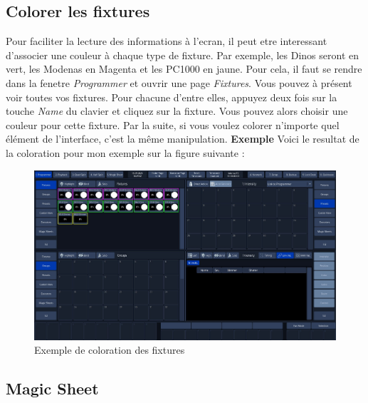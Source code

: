 \subsection{Colorer les fixtures}
\label{subsec:prep_colorer}

Pour faciliter la lecture des informations à l'ecran, il peut etre interessant d'associer une couleur à chaque type de fixture.
Par exemple, les Dinos seront en vert, les Modenas en Magenta et les PC1000 en jaune.
\newline
Pour cela, il faut se rendre dans la fenetre \textit{Programmer} et ouvrir une page \textit{Fixtures}.
\newline
Vous pouvez à présent voir toutes vos fixtures. Pour chacune d'entre elles, appuyez deux fois sur la touche \textit{Name} du clavier
et cliquez sur la fixture. Vous pouvez alors choisir une couleur pour cette fixture.
\newline
Par la suite, si vous voulez colorer n'importe quel élément de l'interface, c'est la même manipulation.
\newline
\newline
\textbf{Exemple}
\newline
\newline
Voici le resultat de la coloration pour mon exemple sur la figure suivante :
\begin{figure}[H]
    \centering
    \includegraphics[width=\textwidth]{3 - Encoder la Chimp/Images/fixture_color.jpg}
    \caption{Exemple de coloration des fixtures}
    \label{fig:exemple_color}
\end{figure}

\subsection{Magic Sheet}
\label{subsec:prep_magic_sheet}

